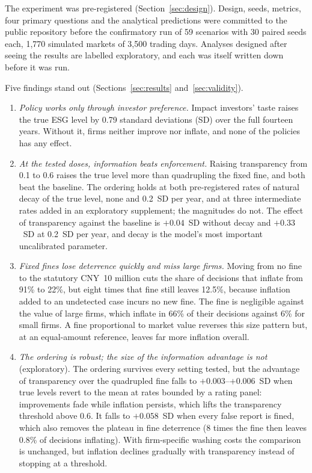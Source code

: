 \documentclass[11pt]{article}
\begin{document}
The experiment was pre-registered (Section~\ref{sec:design}). Design, seeds, metrics, four primary questions and the analytical predictions were committed to the public repository before the confirmatory run of 59 scenarios with 30 paired seeds each, 1,770 simulated markets of 3,500 trading days. Analyses designed after seeing the results are labelled exploratory, and each was itself written down before it was run.

Five findings stand out (Sections~\ref{sec:results} and~\ref{sec:validity}).
\begin{enumerate}[leftmargin=*]
\item \emph{Policy works only through investor preference.} Impact investors' taste raises the true ESG level by 0.79 standard deviations (SD) over the full fourteen years. Without it, firms neither improve nor inflate, and none of the policies has any effect.
\item \emph{At the tested doses, information beats enforcement.} Raising transparency from 0.1 to 0.6 raises the true level more than quadrupling the fixed fine, and both beat the baseline. The ordering holds at both pre-registered rates of natural decay of the true level, none and 0.2~SD per year, and at three intermediate rates added in an exploratory supplement; the magnitudes do not. The effect of transparency against the baseline is $+0.04$~SD without decay and $+0.33$~SD at 0.2~SD per year, and decay is the model's most important uncalibrated parameter.
\item \emph{Fixed fines lose deterrence quickly and miss large firms.} Moving from no fine to the statutory CNY~10 million cuts the share of decisions that inflate from 91\% to 22\%, but eight times that fine still leaves 12.5\%, because inflation added to an undetected case incurs no new fine. The fine is negligible against the value of large firms, which inflate in 66\% of their decisions against 6\% for small firms. A fine proportional to market value reverses this size pattern but, at an equal-amount reference, leaves far more inflation overall.
\item \emph{The ordering is robust; the size of the information advantage is not} (exploratory). The ordering survives every setting tested, but the advantage of transparency over the quadrupled fine falls to $+0.003$--$+0.006$~SD when true levels revert to the mean at rates bounded by a rating panel: improvements fade while inflation persists, which lifts the transparency threshold above 0.6. It falls to $+0.058$~SD when every false report is fined, which also removes the plateau in fine deterrence (8 times the fine then leaves 0.8\% of decisions inflating). With firm-specific washing costs the comparison is unchanged, but inflation declines gradually with transparency instead of stopping at a threshold.

\end{enumerate}
\end{document}

